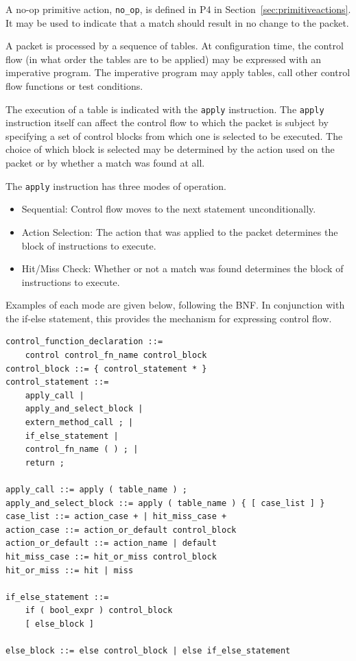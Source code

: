 \documentclass[12pt]{article}
\begin{document}
A no-op primitive action, \texttt{no_op}, is defined in P4 in 
Section~\ref{sec:primitiveactions}. It may be used to indicate that 
a match should result in no change to the packet.



A packet is processed by a sequence of \matchaction tables.  At configuration 
time, the control flow (in what order the tables are to be applied) may be 
expressed with an imperative program. The imperative program may apply tables, 
call other control flow functions or test conditions.

The execution of a table is indicated with the \texttt{apply} instruction.
The \texttt{apply} instruction itself can affect the control flow to which the
packet is subject by specifying a set of control blocks from which one is
selected to be executed. The choice of which block is selected may be
determined by the action used on the packet  or by whether a match was found
at all.

The \texttt{apply} instruction has three modes of operation.

\begin{itemize}
\item
Sequential: Control flow moves to the next statement unconditionally.
\item
Action Selection: The action that was applied to the packet determines the 
block of instructions to execute.
\item
Hit/Miss Check: Whether or not a match was found determines the block of instructions 
to execute.
\end{itemize}

Examples of each mode are given below, following the BNF. In conjunction with 
the if-else statement, this provides the mechanism for expressing control 
flow.

\begin{lstlisting}[style=BNFstyle]
control_function_declaration ::=
    control control_fn_name control_block
control_block ::= { control_statement * }
control_statement ::= 
    apply_call |
    apply_and_select_block |
    extern_method_call ; |
    if_else_statement |
    control_fn_name ( ) ; |
    return ;

apply_call ::= apply ( table_name ) ;
apply_and_select_block ::= apply ( table_name ) { [ case_list ] }
case_list ::= action_case + | hit_miss_case +
action_case ::= action_or_default control_block
action_or_default ::= action_name | default
hit_miss_case ::= hit_or_miss control_block
hit_or_miss ::= hit | miss

if_else_statement ::=
    if ( bool_expr ) control_block
    [ else_block ]

else_block ::= else control_block | else if_else_statement
\end{lstlisting}
\end{document}

